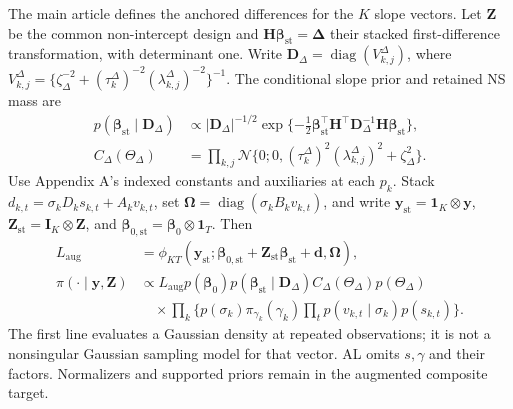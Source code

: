 \documentclass[12pt,letterpaper]{article}
\newcommand{\diag}{\operatorname{diag}}
\newcommand{\vect}[1]{\bm{#1}}
\newcommand{\mat}[1]{\bm{#1}}
\newcommand{\Id}[1]{\mat I_{#1}}
\newcommand{\ones}[1]{\vect 1_{#1}}
\newcommand{\Normal}{\mathcal{N}}
\numberwithin{suppalgorithm}{section}
\numberwithin{equation}{section}
\numberwithin{table}{section}
\numberwithin{figure}{section}
\begin{document}
The main article defines the anchored differences for the \(K\) slope
vectors. Let \(\mat Z\) be the common non-intercept design and
\(\mat H\vect\beta_{\mathrm{st}}=\vect\Delta\) their stacked
first-difference transformation, with determinant one. Write
\(\mat D_\Delta=\diag(V^\Delta_{k,j})\), where
\(V^\Delta_{k,j}=\{\zeta_\Delta^{-2}+
(\tau_k^\Delta)^{-2}(\lambda_{k,j}^\Delta)^{-2}\}^{-1}\).
The conditional slope prior and retained NS mass are
\begin{equation}
\begin{aligned}
p(\vect\beta_{\mathrm{st}}\mid\mat D_\Delta)
&\propto|\mat D_\Delta|^{-1/2}
 \exp\{-\tfrac12\vect\beta_{\mathrm{st}}^\top
 \mat H^\top\mat D_\Delta^{-1}\mat H\vect\beta_{\mathrm{st}}\},\\
C_\Delta(\Theta_\Delta)
&=\prod_{k,j}\Normal\{0;0,
 (\tau_k^\Delta)^2(\lambda_{k,j}^\Delta)^2+\zeta_\Delta^2\}.
\end{aligned}
\label{eq:supp_joint_qvp_prior}
\end{equation}
Use Appendix A's indexed constants and auxiliaries at each \(p_k\).
Stack \(d_{k,t}=\sigma_kD_ks_{k,t}+A_kv_{k,t}\), set
\(\mat\Omega=\diag(\sigma_kB_kv_{k,t})\), and write
\(\vect y_{\mathrm{st}}=\ones{K}\otimes\vect y\),
\(\mat Z_{\mathrm{st}}=\Id{K}\otimes\mat Z\), and
\(\vect\beta_{0,\mathrm{st}}=\vect\beta_0\otimes\ones{T}\).
Then
\begin{align}
L_{\mathrm{aug}}&=\phi_{KT}(\vect y_{\mathrm{st}};
 \vect\beta_{0,\mathrm{st}}+\mat Z_{\mathrm{st}}\vect\beta_{\mathrm{st}}
 +\vect d,\mat\Omega),
\label{eq:supp_joint_stacked_likelihood}\\
\pi(\cdot\mid\vect y,\mat Z)&\propto L_{\mathrm{aug}}p(\vect\beta_0)
 p(\vect\beta_{\mathrm{st}}\mid\mat D_\Delta)
 C_\Delta(\Theta_\Delta)p(\Theta_\Delta)\nonumber\\
&\quad\times\prod_k\{p(\sigma_k)\pi_{\gamma_k}(\gamma_k)
 \prod_t p(v_{k,t}\mid\sigma_k)p(s_{k,t})\}.
\label{eq:supp_joint_complete_posterior}
\end{align}
The first line evaluates a Gaussian density at repeated observations; it
is not a nonsingular Gaussian sampling model for that vector. AL omits
\(s,\gamma\) and their factors. Normalizers and supported priors remain
in the augmented composite target.
\end{document}

